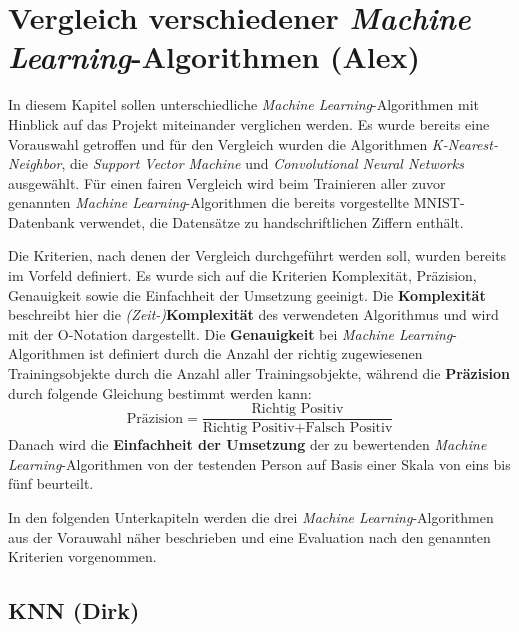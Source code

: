 \section{Vergleich verschiedener \textit{Machine Learning}-Algorithmen (Alex)}
In diesem Kapitel sollen unterschiedliche \textit{Machine Learning}-Algorithmen mit Hinblick auf das Projekt miteinander verglichen werden.
Es wurde bereits eine Vorauswahl getroffen und für den Vergleich wurden die Algorithmen \textit{K-Nearest-Neighbor}, die \textit{Support Vector Machine} und
\textit{Convolutional Neural Networks} ausgewählt. Für einen fairen Vergleich wird beim Trainieren aller zuvor genannten \textit{Machine Learning}-Algorithmen
die bereits vorgestellte MNIST-Datenbank verwendet, die Datensätze zu handschriftlichen Ziffern enthält.

Die Kriterien, nach denen der Vergleich durchgeführt werden soll, wurden bereits im Vorfeld definiert. Es wurde sich auf die Kriterien Komplexität,
Präzision, Genauigkeit sowie die Einfachheit der Umsetzung geeinigt. Die \textbf{Komplexität} beschreibt hier die \textit{(Zeit-)}\textbf{Komplexität} des verwendeten Algorithmus und wird mit der O-Notation dargestellt.
Die \textbf{Genauigkeit} bei \textit{Machine Learning}-Algorithmen ist definiert durch die Anzahl der richtig zugewiesenen Trainingsobjekte durch die Anzahl aller
Trainingsobjekte, während die \textbf{Präzision} durch folgende Gleichung bestimmt werden kann:
\[ \text{Präzision} = \frac{\text{Richtig Positiv}}{\text{Richtig Positiv} + \text{Falsch Positiv}} \]
Danach wird die \textbf{Einfachheit der Umsetzung} der zu bewertenden \textit{Machine Learning}-Algorithmen von der testenden Person auf Basis einer Skala von
eins bis fünf beurteilt.

In den folgenden Unterkapiteln werden die drei \textit{Machine Learning}-Algorithmen aus der Vorauwahl näher beschrieben und eine Evaluation nach den genannten 
Kriterien vorgenommen.

\subsection{KNN (Dirk)}

